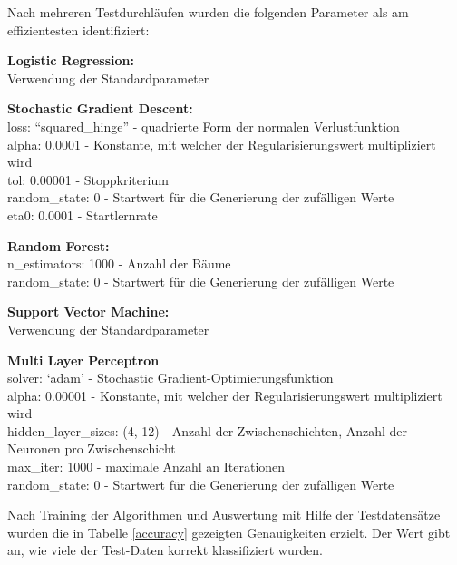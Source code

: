 \documentclass[a4paper,12pt]{article}
\begin{document}
Nach mehreren Testdurchläufen wurden die folgenden Parameter als am effizientesten identifiziert:

\begin{description}

\item{\textbf{Logistic Regression:}} \\
Verwendung der Standardparameter

\item{\textbf{Stochastic Gradient Descent:}} \\
loss: ``squared\_hinge'' - quadrierte Form der normalen Verlustfunktion \\
alpha: 0.0001 - Konstante, mit welcher der Regularisierungswert multipliziert wird \\
tol: 0.00001 - Stoppkriterium \\
random\_state: 0 - Startwert für die Generierung der zufälligen Werte \\
eta0: 0.0001 - Startlernrate

\item{\textbf{Random Forest:}} \\
n\_estimators: 1000 - Anzahl der Bäume \\
random\_state: 0 - Startwert für die Generierung der zufälligen Werte 

\item{\textbf{Support Vector Machine:}} \\
Verwendung der Standardparameter

\item{\textbf{Multi Layer Perceptron}} \\
solver: `adam' - Stochastic Gradient-Optimierungsfunktion \\
alpha: 0.00001 - Konstante, mit welcher der Regularisierungswert multipliziert wird \\
hidden\_layer\_sizes: (4, 12) - Anzahl der Zwischenschichten, Anzahl der Neuronen pro Zwischenschicht \\
max\_iter: 1000 - maximale Anzahl an Iterationen \\
random\_state: 0 - Startwert für die Generierung der zufälligen Werte


\end{description}


Nach Training der Algorithmen und Auswertung mit Hilfe der Testdatensätze wurden die in Tabelle \ref{accuracy} gezeigten Genauigkeiten erzielt. Der Wert gibt an, wie viele der Test-Daten korrekt klassifiziert wurden. 
\end{document}
